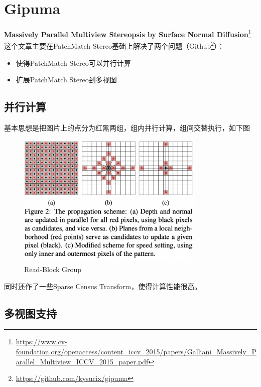 \section{Gipuma}

\textbf{Massively Parallel Multiview Stereopsis by Surface Normal Diffusion}\footnote{\url{https://www.cv-foundation.org/openaccess/content_iccv_2015/papers/Galliani_Massively_Parallel_Multiview_ICCV_2015_paper.pdf}} 这个文章主要在PatchMatch Stereo基础上解决了两个问题（Github\footnote{\url{https://github.com/kysucix/gipuma}}）：

\begin{itemize}
	\item 使得PatchMatch Stereo可以并行计算
	\item 扩展PatchMatch Stereo到多视图
\end{itemize}

\subsection{并行计算}

基本思想是把图片上的点分为红黑两组，组内并行计算，组间交替执行，如下图

\begin{figure}[H]
	\begin{center}
		\includegraphics[width=0.8\textwidth]{../images/parallel_compute.png}
	\end{center}
	\caption{Read-Block Group}
\end{figure}

同时还作了一些Sparse Census Transform，使得计算性能很高。

\subsection{多视图支持}

